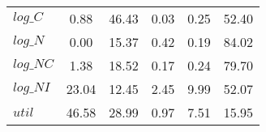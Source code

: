\begin{center}
\begin{longtable}{lccccc}
$log\_C          $	 & 	        0.88	 & 	       46.43	 & 	        0.03	 & 	        0.25	 & 	       52.40 \\ 
$log\_N          $	 & 	        0.00	 & 	       15.37	 & 	        0.42	 & 	        0.19	 & 	       84.02 \\ 
$log\_NC         $	 & 	        1.38	 & 	       18.52	 & 	        0.17	 & 	        0.24	 & 	       79.70 \\ 
$log\_NI         $	 & 	       23.04	 & 	       12.45	 & 	        2.45	 & 	        9.99	 & 	       52.07 \\ 
${util}          $	 & 	       46.58	 & 	       28.99	 & 	        0.97	 & 	        7.51	 & 	       15.95 \\ 
\end{longtable}
 \end{center}
